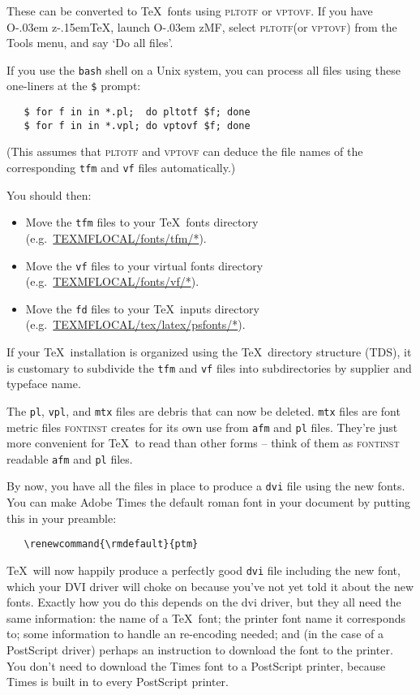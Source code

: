 \documentclass[a4paper]{ltxguide}
\newcommand*{\OzTeX}{O\kern-.03em z\kern-.15em\TeX}
\newcommand*{\OzMF}{O\kern-.03em zMF}
\newcommand{\PS}{Post\-Script\xspace}
\newcommand*{\setfilename}[1]{\texttt{#1}}
\newcommand*{\setpackagename}[1]{\textsc{#1}}
\newcommand{\fontinst}{\setpackagename{font\-inst}\xspace}
\newcommand{\vf} {\setfilename{vf}\xspace}
\newcommand{\pl} {\setfilename{pl}\xspace}
\newcommand{\fd} {\setfilename{fd}\xspace}
\newcommand{\afm}{\setfilename{afm}\xspace}
\newcommand{\vpl}{\setfilename{vpl}\xspace}
\newcommand{\tfm}{\setfilename{tfm}\xspace}
\newcommand{\mtx}{\setfilename{mtx}\xspace}
\newcommand{\dvi}{\setfilename{dvi}\xspace}
\newcommand{\vptovf}{\setpackagename{vptovf}\xspace}
\newcommand{\pltotf}{\setpackagename{pltotf}\xspace}
\begin{document}
These can be converted to \TeX\ fonts using \pltotf or \vptovf.
If you have \OzTeX, launch \OzMF, select \pltotf (or \vptovf) from
the Tools menu, and say `Do all files'.

If you use the \texttt{bash} shell on a Unix system,  you can
process all files using these one-liners at the \verb|$| prompt:
\begin{verbatim}
   $ for f in in *.pl;  do pltotf $f; done
   $ for f in in *.vpl; do vptovf $f; done
\end{verbatim}%
(This assumes that \pltotf and \vptovf can deduce the file names
of the corresponding \tfm and \vf files automatically.)

You should then:
\begin{itemize}
\item Move the \tfm files to your \TeX\ fonts directory\\
   (e.g.~\url{TEXMFLOCAL/fonts/tfm/*}).
\item Move the \vf files to your virtual fonts directory\\
   (e.g.~\url{TEXMFLOCAL/fonts/vf/*}).
\item Move the \fd files to your \TeX\ inputs directory\\
   (e.g.~\url{TEXMFLOCAL/tex/latex/psfonts/*}).
\end{itemize}
If your \TeX\ installation is organized using the \TeX\ directory
structure (TDS), it is customary to subdivide the \tfm and \vf
files into subdirectories by supplier and typeface name.

The \pl, \vpl, and \mtx files are debris that can now be deleted.
\mtx files are font metric files \fontinst creates for its own use
from \afm and \pl files.  They're just more convenient for \TeX\
to read than other forms -- think of them as \fontinst readable
\afm and \pl files.

By now, you have all the files in place to produce a \dvi file
using the new fonts.  You can make Adobe Times the default roman
font in your document by putting this in your preamble:
\begin{verbatim}
   \renewcommand{\rmdefault}{ptm}
\end{verbatim}

\TeX\ will now happily produce a perfectly good \dvi file
including the new font, which your DVI driver will choke on
because you've not yet told it about the new fonts.  Exactly how
you do this depends on the dvi driver, but they all need the same
information: the name of a \TeX\ font; the printer font name it
corresponds to; some information to handle an re-encoding needed;
and (in the case of a \PS driver) perhaps an instruction to
download the font to the printer.  You don't need to download the
Times font to a \PS printer, because Times is built in to every
\PS printer.
\end{document}

